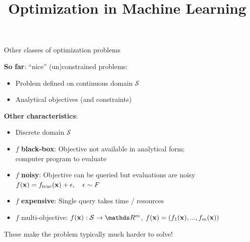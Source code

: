 \documentclass[11pt,compress,t,notes=noshow, xcolor=table]{beamer}
\title{Optimization in Machine Learning}
\date{}
\begin{document}
\sloppy

\begin{vbframe}{Other classes of optimization problems}

\textbf{So far}: \enquote{nice} (un)constrained problems: 

\begin{itemize}
	\item Problem defined on continuous domain $\mathcal{S}$
	\item Analytical objectives (and constraints)
\end{itemize}

\lz 

\textbf{Other characteristics}: 
\begin{itemize}
	\item Discrete domain $\mathcal{S}$
	\item $f$ \textbf{black-box}: Objective not available in analytical form;\\computer program to evaluate
	\item $f$ \textbf{noisy}: Objective can be queried but evaluations are noisy $f(\mathbf{x}) = f_{\text{true}}(\mathbf{x}) + \epsilon, \quad \epsilon \sim F$
	\item $f$ \textbf{expensive}: Single query takes time / resources
	\item $f$ multi-objective: $\fx: \mathcal{S} \to \R^m$, $f(\mathbf{x}) = \left(f_1(\mathbf{x}), ..., f_m(\mathbf{x})\right)$
\end{itemize}

\lz 

These make the problem typically much harder to solve!

\end{vbframe}
\end{document}
